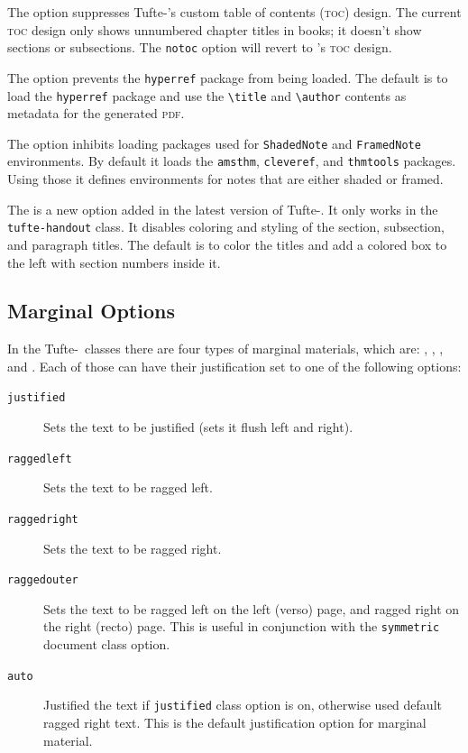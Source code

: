 \documentclass[a4paper]{tufte-handout}
\newcommand{\TL}{Tufte-\hologo{LaTeX}\xspace}
\newcommand{\hlorange}[1]{\textcolor{tufte-orange}{#1}}
\newcommand{\doccmd}[1]{\hlorange{\texttt{\textbackslash#1}}}
\newcommand{\docenv}[1]{\hlorange{\texttt{#1}}}
\newcommand{\docpkg}[1]{\hlorange{\texttt{#1}}}
\newcommand{\doccls}[1]{\texttt{#1}}
\newcommand{\docclsopt}[1]{\hlorange{\texttt{#1}}}
\begin{document}
The  option suppresses \TL's custom table of contents (\textsc{toc}) design.
The current \textsc{toc} design only shows unnumbered chapter titles in books; it doesn't show sections or subsections. 
The \docclsopt{notoc} option will revert to 's \textsc{toc} design.

The  option prevents the \docpkg{hyperref} package from being loaded.
The default is to load the \docpkg{hyperref} package and use the \doccmd{title} and \doccmd{author} contents as metadata for the generated \textsc{pdf}.

The  option inhibits loading packages used for \docenv{ShadedNote} and \docenv{FramedNote} environments.
By default it loads the \docpkg{amsthm}, \docpkg{cleveref}, and \docpkg{thmtools} packages.
Using those it defines environments for notes that are either shaded or framed.

The  is a new option added in the latest version of \TL.
It only works in the \doccls{tufte-handout} class.
It disables coloring and styling of the section, subsection, and paragraph titles.
The default is to color the titles and add a colored box to the left with section numbers inside it.

\subsection{Marginal Options}\label{ssec:marginal-options}
In the \TL\ classes there are four types of marginal materials, which are:
, , , and .
Each of those can have their justification set to one of the following options:
\begin{description}
  \item[\docclsopt{justified}] Sets the text to be justified (sets it flush left and right).
  \item[\docclsopt{raggedleft}] Sets the text to be ragged left.
  \item[\docclsopt{raggedright}] Sets the text to be ragged right.
  \item[\docclsopt{raggedouter}] Sets the text to be ragged left on the left (verso) page, and ragged right on the right (recto) page.
  This is useful in conjunction with the \docclsopt{symmetric} document class option.
  \item[\docclsopt{auto}] Justified the text if \docclsopt{justified} class option is on, otherwise used default ragged right text.
  This is the default justification option for marginal material.
\end{description}
\end{document}
